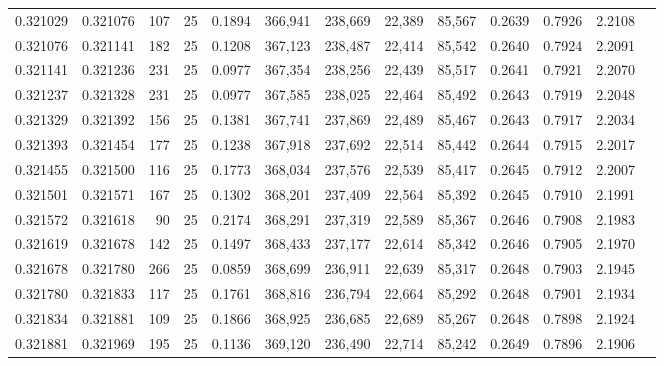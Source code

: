 \begin{tabular}{rrrrrrrrrrrrr}
0.321029 & 0.321076 &   107 &  25 &                                     0.1894 & 366,941 & 238,669 &  22,389 &  85,567 & 0.2639 & 0.7926 & 2.2108 \\
0.321076 & 0.321141 &   182 &  25 &                                     0.1208 & 367,123 & 238,487 &  22,414 &  85,542 & 0.2640 & 0.7924 & 2.2091 \\
0.321141 & 0.321236 &   231 &  25 &                                     0.0977 & 367,354 & 238,256 &  22,439 &  85,517 & 0.2641 & 0.7921 & 2.2070 \\
0.321237 & 0.321328 &   231 &  25 &                                     0.0977 & 367,585 & 238,025 &  22,464 &  85,492 & 0.2643 & 0.7919 & 2.2048 \\
0.321329 & 0.321392 &   156 &  25 &                                     0.1381 & 367,741 & 237,869 &  22,489 &  85,467 & 0.2643 & 0.7917 & 2.2034 \\
0.321393 & 0.321454 &   177 &  25 &                                     0.1238 & 367,918 & 237,692 &  22,514 &  85,442 & 0.2644 & 0.7915 & 2.2017 \\
0.321455 & 0.321500 &   116 &  25 &                                     0.1773 & 368,034 & 237,576 &  22,539 &  85,417 & 0.2645 & 0.7912 & 2.2007 \\
0.321501 & 0.321571 &   167 &  25 &                                     0.1302 & 368,201 & 237,409 &  22,564 &  85,392 & 0.2645 & 0.7910 & 2.1991 \\
0.321572 & 0.321618 &    90 &  25 &                                     0.2174 & 368,291 & 237,319 &  22,589 &  85,367 & 0.2646 & 0.7908 & 2.1983 \\
0.321619 & 0.321678 &   142 &  25 &                                     0.1497 & 368,433 & 237,177 &  22,614 &  85,342 & 0.2646 & 0.7905 & 2.1970 \\
0.321678 & 0.321780 &   266 &  25 &                                     0.0859 & 368,699 & 236,911 &  22,639 &  85,317 & 0.2648 & 0.7903 & 2.1945 \\
0.321780 & 0.321833 &   117 &  25 &                                     0.1761 & 368,816 & 236,794 &  22,664 &  85,292 & 0.2648 & 0.7901 & 2.1934 \\
0.321834 & 0.321881 &   109 &  25 &                                     0.1866 & 368,925 & 236,685 &  22,689 &  85,267 & 0.2648 & 0.7898 & 2.1924 \\
0.321881 & 0.321969 &   195 &  25 &                                     0.1136 & 369,120 & 236,490 &  22,714 &  85,242 & 0.2649 & 0.7896 & 2.1906 \\

\end{tabular}
